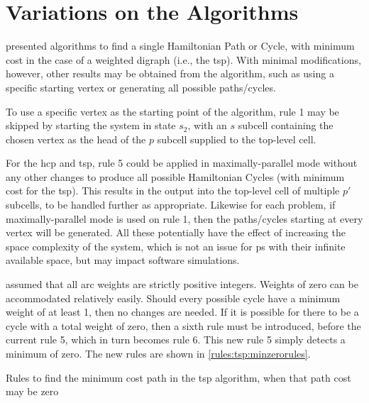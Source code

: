 \section{\label{sec:tsp:variations}Variations on the Algorithms}
 presented algorithms to find a single Hamiltonian Path or Cycle, with minimum cost in the case of a weighted digraph (i.e., the \gls{tsp}).  With minimal modifications, however, other results may be obtained from the algorithm, such as using a specific starting vertex or generating all possible paths/cycles.

To use a specific vertex as the starting point of the algorithm, rule 1 may be skipped by starting the system in state \(s_2\), with an \(s\) subcell containing the chosen vertex as the head of the \(p\) subcell supplied to the top-level cell.

For the \gls{hcp} and \gls{tsp}, rule 5 could be applied in maximally-parallel mode without any other changes to produce all possible Hamiltonian Cycles (with minimum cost for the \gls{tsp}).  This results in the output into the top-level cell of multiple \(p'\) subcells, to be handled further as appropriate.  Likewise for each problem, if maximally-parallel mode is used on rule 1, then the paths/cycles starting at every vertex will be generated.  All these potentially have the effect of increasing the space complexity of the system, which is not an issue for \gls{ps} with their infinite available space, but may impact software simulations.

 assumed that all arc weights are strictly positive integers.  Weights of zero can be accommodated relatively easily.  Should every possible cycle have a minimum weight of at least 1, then no changes are needed.  If it is possible for there to be a cycle with a total weight of zero, then a sixth rule must be introduced, before the current rule 5, which in turn becomes rule 6.  This new rule 5 simply detects a minimum of zero.  The new rules are shown in \cref{rules:tsp:minzerorules}.


\begin{cprulesetfloat}
\begin{cpruleset}
    
    
\end{cpruleset}
\caption[Rules to find the minimum cost path when it may be zero]{\label{rules:tsp:minzerorules}Rules to find the minimum cost path in the \gls{tsp} algorithm, when that path cost may be zero}
\end{cprulesetfloat}